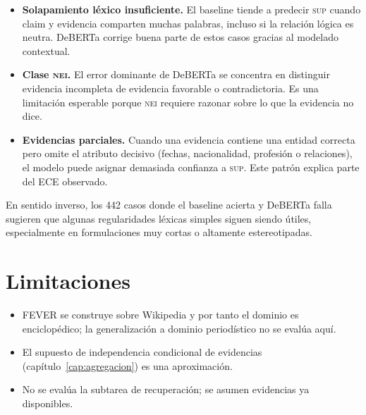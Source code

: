 \begin{itemize}[leftmargin=*,itemsep=0.2em]
  \item \textbf{Solapamiento léxico insuficiente.} El baseline tiende a
    predecir \textsc{sup} cuando claim y evidencia comparten muchas
    palabras, incluso si la relación lógica es neutra. DeBERTa
    corrige buena parte de estos casos gracias al modelado
    contextual.
  \item \textbf{Clase \textsc{nei}.} El error dominante de DeBERTa se
    concentra en distinguir evidencia incompleta de evidencia
    favorable o contradictoria. Es una limitación esperable porque
    \textsc{nei} requiere razonar sobre lo que la evidencia no dice.
  \item \textbf{Evidencias parciales.} Cuando una evidencia contiene una
    entidad correcta pero omite el atributo decisivo (fechas,
    nacionalidad, profesión o relaciones), el modelo puede asignar
    demasiada confianza a \textsc{sup}. Este patrón explica parte
    del ECE observado.
\end{itemize}

En sentido inverso, los 442 casos donde el baseline acierta y DeBERTa
falla sugieren que algunas regularidades léxicas simples siguen siendo
útiles, especialmente en formulaciones muy cortas o altamente
estereotipadas.

\section{Limitaciones}

\begin{itemize}[leftmargin=*,itemsep=0.2em]
  \item FEVER se construye sobre Wikipedia y por tanto el dominio es
        enciclopédico; la generalización a dominio periodístico no se
        evalúa aquí.
  \item El supuesto de independencia condicional de evidencias
        (capítulo~\ref{cap:agregacion}) es una aproximación.
  \item No se evalúa la subtarea de recuperación; se asumen evidencias
        ya disponibles.
\end{itemize}
